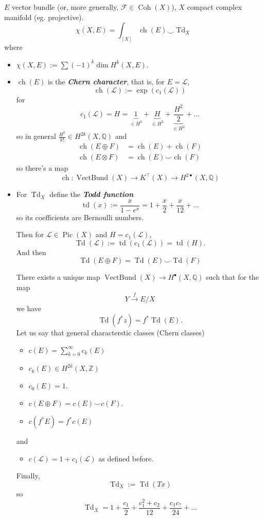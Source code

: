 \documentclass{article}
\newcommand{\Z}{\mathbb{Z}}
\newcommand{\Q}{\mathbb{Q}}
\newcommand{\Fc}{\mathcal{F}}
\newcommand{\Lc}{\mathcal{L}}
\DeclareMathOperator{\Td}{Td}
\DeclareMathOperator{\td}{td}
\DeclareMathOperator{\VectBund}{VectBund}
\DeclareMathOperator{\Coh}{Coh}
\DeclareMathOperator{\Pic}{Pic}
\DeclareMathOperator{\ch}{ch}
\begin{document}
\begin{thm}
	$E$ vector bundle (or, more generally, $\Fc\in\Coh(X)$), $X$ compact complex manifold (eg. projective).
	\[\chi(X,E)=\int_{[X]}\ch(E)\smile \Td_X\]
	where
	\begin{itemize}
		\item $\chi(X,E):=\sum(-1)^k\dim H^k(X,E)$.
		\item $\ch(E)$ is the \textbf{\textit{Chern character}}, that is, for $E=\Lc$,
		\[\ch(\Lc):=\exp(c_1(\Lc))\]
		for
		\[c_1(\Lc)=H=\underbrace{1}_{\in H^0}+\underbrace{H}_{\in H^2}+\underbrace{\frac{H^2}{2}}_{\in H^4}+\ldots\]
		so in general $\frac{H^k}{k!}\in H^{2k}(X,\Q)$ and
		\begin{align*}
			\ch(E\oplus F)&=\ch(E)+\ch(F)\\
			\ch(E\otimes F)&=\ch(E)\smile\ch(F)
		\end{align*}
		so there's a map
		\[\ch:\VectBund(X)\to K^{\top}(X)\to H^{2\bullet}(X,\Q)\]
		\item For $\Td_X$ define the \textbf{\textit{Todd function}}
		\[\td(x):=\frac{x}{1-e^x}=1+\frac{x}{2}+\frac{x}{12}+\ldots\]
		so its coefficients are Bernoulli numbers.
		
		Then for $\Lc\in\Pic(X)$ and $H=c_1(\Lc)$,
		\[\Td(\Lc):=\td(c_1(\Lc))=\td(H).\]
		And then
		\[\Td(E\oplus F)=\Td(E)\smile\Td(F)\]
		\begin{claim}
			There exists a unique map $\VectBund(X)\to H^{\bullet}(X,\Q)$ such that for the map
			\[Y\overset{f}{\to}E/X\]
			we have
			\[\Td(f^*z)=f^*\Td(E).\]
			Let us say that general characterstic classes (Chern classes)
			\begin{itemize}[label=$\circ$]
				\item $c(E)=\sum_{k=0}^\infty c_k(E)$
				\item $c_k(E)\in H^{2k}(X,\Z)$
				\item $c_0(E)=1$.
				\item $c(E\oplus F)=c(E)\smile c(F)$.
				\item $c(f^*E)=f^*c(E)$
			\end{itemize}
			and
			\begin{itemize}[label=$\circ$]
				\item $c(\Lc)=1+c_1(\Lc)$ as defined before.
			\end{itemize}
			Finally,
			\[\Td_X:=\Td(Tx)\]
			so
			\[\Td_X=1+\frac{c_1}{2}+\frac{c_1^2+c_2}{12}+\frac{c_1c_?}{24}+\ldots\]
		\end{claim}
	\end{itemize}
\end{thm}
\end{document}
